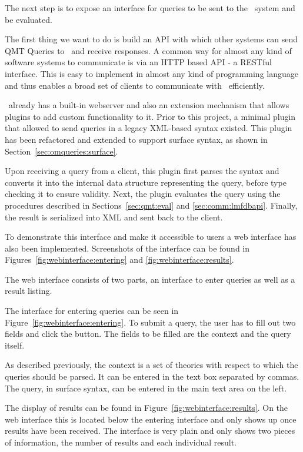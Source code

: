 The next step is to expose an interface for queries to be sent to the \mmt\ system and be evaluated.

The first thing we want to do is build an API with which other systems can send QMT Queries to \mmt\ and receive responses. 
A common way for almost any kind of software systems to communicate is via an HTTP based API - a RESTful interface. 
This is easy to implement in almost any kind of programming language and thus enables a broad set of clients to communicate with \mmt\ efficiently. 

\mmt\ already has a built-in webserver and also an extension mechanism that allows plugins to add custom functionality to it. 
Prior to this project, a minimal plugin that allowed to send queries in a legacy XML-based syntax existed. 
This plugin has been refactored and extended to support surface syntax, as shown in Section~\ref{sec:omqueries:surface}. 

Upon receiving a query from a client, this plugin first parses the syntax and converts it into the internal data structure representing the query, before type checking it to ensure validity. 
Next, the plugin evaluates the query using the procedures described in Sections~\ref{sec:qmt:eval} and \ref{sec:comm:lmfdbapi}.
Finally, the result is serialized into XML and sent back to the client. 


To demonstrate this interface and make it accessible to users a web interface has also been implemented. 
Screenshots of the interface can be found in Figures~\ref{fig:webinterface:entering} and \ref{fig:webinterface:results}. 



The web interface consists of two parts, an interface to enter queries as well as a result listing. 

The interface for entering queries can be seen in Figure~\ref{fig:webinterface:entering}. 
To submit a query, the user has to fill out two fields and click the  button. 
The fields to be filled are the context and the query itself. 

As described previously, the context is a set of theories with respect to which the queries should be parsed. 
It can be entered in the  text box separated by commas. 
The query, in surface syntax, can be entered in the main text area on the left. 

The display of results can be found in Figure~\ref{fig:webinterface:results}. 
On the web interface this is located below the entering interface and only shows up once results have been received. 
The interface is very plain and only shows two pieces of information, the number of results and each individual result. 